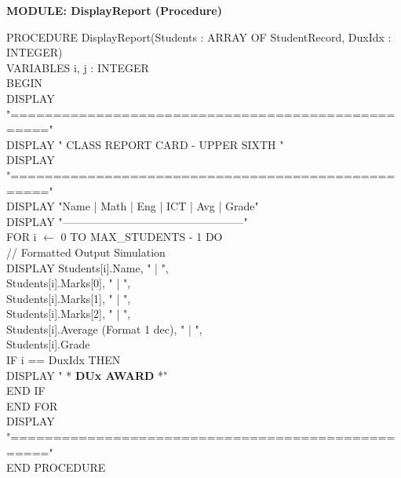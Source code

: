 \documentclass[11pt]{article}
\begin{document}
\begin{exoresolu}
\textbf{MODULE: DisplayReport (Procedure)}
\begin{flushleft}
\ttfamily\small
PROCEDURE DisplayReport(Students : ARRAY OF StudentRecord, DuxIdx : INTEGER)\\
VARIABLES i, j : INTEGER\\
BEGIN\\
\hspace{1em}DISPLAY "=================================================="\\
\hspace{1em}DISPLAY "           CLASS REPORT CARD - UPPER SIXTH        "\ \\
\hspace{1em}DISPLAY "=================================================="\\
\hspace{1em}DISPLAY "Name        | Math | Eng | ICT | Avg  | Grade"\\
\hspace{1em}DISPLAY "--------------------------------------------------"\\
\hspace{1em}FOR i $\leftarrow$ 0 TO MAX\_STUDENTS - 1 DO\\
\hspace{2em}// Formatted Output Simulation\\
\hspace{2em}DISPLAY Students[i].Name, " | ", \\
\hspace{3em}Students[i].Marks[0], " | ",\\
\hspace{3em}Students[i].Marks[1], " | ",\\
\hspace{3em}Students[i].Marks[2], " | ",\\
\hspace{3em}Students[i].Average (Format 1 dec), " | ",\\
\hspace{3em}Students[i].Grade\\
\hspace{2em}IF i == DuxIdx THEN\\
\hspace{3em}DISPLAY "  *\textbf{ DUx AWARD }*"\\
\hspace{2em}END IF\\
\hspace{1em}END FOR\\
\hspace{1em}DISPLAY "=================================================="\\
END PROCEDURE
\end{flushleft}


\end{exoresolu}
\end{document}
